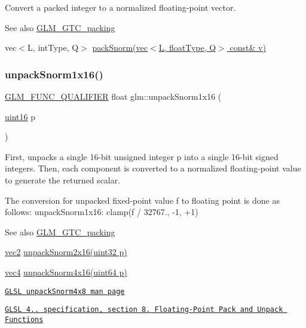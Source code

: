 Convert a packed integer to a normalized floating-\/point vector.

\begin{DoxySeeAlso}{See also}
\hyperlink{group__gtc__packing}{G\+L\+M\+\_\+\+G\+T\+C\+\_\+packing} 

vec$<$\+L, int\+Type, Q$>$ \hyperlink{group__gtc__packing_gaa54b5855a750d6aeb12c1c902f5939b8}{pack\+Snorm(vec$<$\+L, float\+Type, Q$>$ const\& v)} 
\end{DoxySeeAlso}
\mbox{\label{group__gtc__packing_ga246f451cebf590726324f7a283e3d65e}} 
\subsubsection{\texorpdfstring{unpack\+Snorm1x16()}{unpackSnorm1x16()}}
{\footnotesize\ttfamily \hyperlink{setup_8hpp_a33fdea6f91c5f834105f7415e2a64407}{G\+L\+M\+\_\+\+F\+U\+N\+C\+\_\+\+Q\+U\+A\+L\+I\+F\+I\+ER} float glm\+::unpack\+Snorm1x16 (\begin{DoxyParamCaption}\item[{\hyperlink{group__gtc__type__precision_gad8c2939e1fdd8e5828b31d95c52255d5}{uint16}}]{p }\end{DoxyParamCaption})}

First, unpacks a single 16-\/bit unsigned integer p into a single 16-\/bit signed integers. Then, each component is converted to a normalized floating-\/point value to generate the returned scalar.

The conversion for unpacked fixed-\/point value f to floating point is done as follows\+: unpack\+Snorm1x16\+: clamp(f / 32767., -\/1, +1)

\begin{DoxySeeAlso}{See also}
\hyperlink{group__gtc__packing}{G\+L\+M\+\_\+\+G\+T\+C\+\_\+packing} 

\hyperlink{group__core__types_gaa1618f51db67eaa145db101d8c8431d8}{vec2} \hyperlink{group__core__func__packing_gacd8f8971a3fe28418be0d0fa1f786b38}{unpack\+Snorm2x16(uint32 p)} 

\hyperlink{group__core__types_ga5881b1b022d7fd1b7218f5916532dd02}{vec4} \hyperlink{group__gtc__packing_ga1bfaa3f217fd7a4b6b9d3117ecb3fcac}{unpack\+Snorm4x16(uint64 p)} 

\href{http://www.opengl.org/sdk/docs/manglsl/xhtml/unpackSnorm1x16.xml}{\tt G\+L\+SL unpack\+Snorm4x8 man page} 

\href{http://www.opengl.org/registry/doc/GLSLangSpec.4.20.8.pdf}{\tt G\+L\+SL 4.. specification, section 8. Floating-\/\+Point Pack and Unpack Functions} 
\end{DoxySeeAlso}
\mbox{\label{group__gtc__packing_ga6f2bebf536fbf7c8b97d4b306bb3354e}} 
